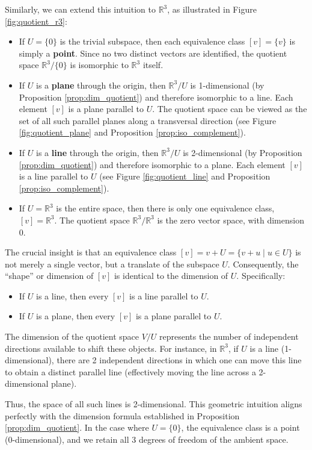 Similarly, we can extend this intuition to $\mathbb{R}^3$, as illustrated in Figure \ref{fig:quotient_r3}:
\begin{itemize}
  \item If $U = \{0\}$ is the trivial subspace, then each equivalence class $[v] = \{v\}$ is simply a \textbf{point}. Since no two distinct vectors are identified, the quotient space $\mathbb{R}^3/\{0\}$ is isomorphic to $\mathbb{R}^3$ itself.
  \item If $U$ is a \textbf{plane} through the origin, then $\mathbb{R}^3/U$ is 1-dimensional (by Proposition \ref{prop:dim_quotient}) and therefore isomorphic to a line. Each element $[v]$ is a plane parallel to $U$. The quotient space can be viewed as the set of all such parallel planes  along a transversal direction (see Figure \ref{fig:quotient_plane} and Proposition \ref{prop:iso_complement}).
  \item If $U$ is a \textbf{line} through the origin, then $\mathbb{R}^3/U$ is 2-dimensional (by Proposition \ref{prop:dim_quotient}) and therefore isomorphic to a plane. Each element $[v]$ is a line parallel to $U$ (see Figure \ref{fig:quotient_line} and Proposition \ref{prop:iso_complement}).
  \item If $U = \mathbb{R}^3$ is the entire space, then there is only one equivalence class, $[v] = \mathbb{R}^3$. The quotient space $\mathbb{R}^3/\mathbb{R}^3$ is the zero vector space, with dimension $0$.
\end{itemize}

\begin{remark}
  The crucial insight is that an equivalence class $[v] = v + U = \{v + u \mid u \in U\}$ is not merely a single vector, but a translate of the subspace $U$. Consequently, the ``shape'' or dimension of $[v]$ is identical to the dimension of $U$. Specifically:
  \begin{itemize}
    \item If $U$ is a line, then every $[v]$ is a line parallel to $U$.
    \item If $U$ is a plane, then every $[v]$ is a plane parallel to $U$.
  \end{itemize}
  The dimension of the quotient space $V/U$ represents the number of independent directions available to shift these objects. For instance, in $\mathbb{R}^3$, if $U$ is a line (1-dimensional), there are 2 independent directions in which one can move this line to obtain a distinct parallel line (effectively moving the line across a 2-dimensional plane). 
  
  Thus, the space of all such lines is 2-dimensional. This geometric intuition aligns perfectly with the dimension formula established in Proposition \ref{prop:dim_quotient}. In the case where $U = \{0\}$, the equivalence class is a point (0-dimensional), and we retain all 3 degrees of freedom of the ambient space.
\end{remark}

